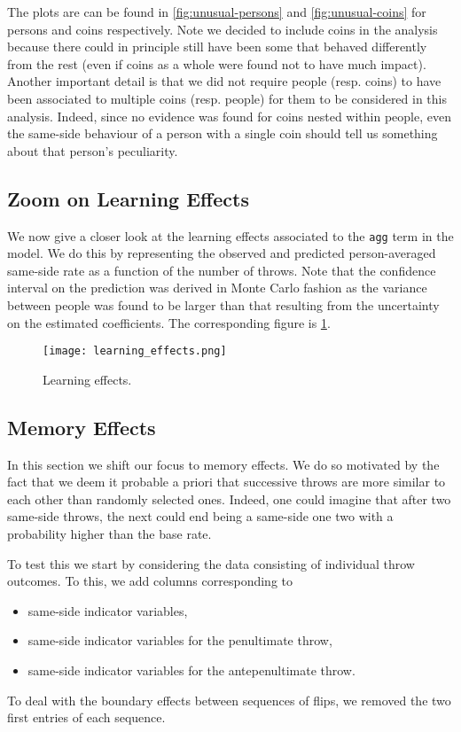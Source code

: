 \documentclass[a4paper, 12pt,oneside]{article}
\begin{document}
		The plots are can be found in \ref{fig:unusual-persons} and \ref{fig:unusual-coins} for persons and coins respectively. Note we decided to include coins in the analysis because there could in principle still have been some that behaved differently from the rest (even if coins as a whole were found not to have much impact). 
		Another important detail is that we did not require people (resp. coins) to have been associated to multiple coins (resp. people) for them to be considered in this analysis. Indeed, since no evidence was found for coins nested within people, even the same-side behaviour of a person with a single coin should tell us something about that person's peculiarity.
		\subsection{Zoom on Learning Effects}
			We now give a closer look at the learning effects associated to the \texttt{agg} term in the model. We do this by representing the observed and predicted person-averaged same-side rate as a function of the number of throws.  Note that the confidence interval on the prediction was derived in Monte Carlo fashion as the variance between people was found to be larger than that resulting from the uncertainty on the estimated coefficients. 
			The corresponding figure is \ref{fig:learning-effects}. 
			\begin{figure}[htb]
				\centering
				\texttt{[image: learning\_effects.png]}
				\caption{Learning effects.}
				\label{fig:learning-effects}
			\end{figure}
		\subsection{Memory Effects}
		In this section we shift our focus to memory effects. We do so motivated by the fact that we deem it probable a priori that successive throws are more similar to each other than randomly selected ones. Indeed, one could imagine that after two same-side throws, the next could end being a same-side one two with a probability higher than the base rate. 
		
		To test this we start by considering the data consisting of individual throw outcomes. To this, we add columns corresponding to 
		\begin{itemize}
			\item same-side indicator variables,
			\item same-side indicator variables for the penultimate throw,
			\item same-side indicator variables for the antepenultimate throw.
		\end{itemize}
		To deal with the boundary effects between sequences of flips, we removed the two first entries of each sequence. 
		
\end{document}
